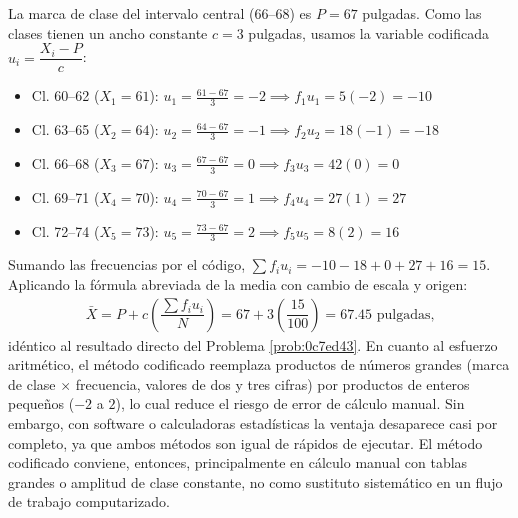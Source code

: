 \begin{solproblema}
	La marca de clase del intervalo central (66--68) es $P = 67$ pulgadas. Como las clases tienen un ancho constante $c = 3$ pulgadas, usamos la variable codificada $u_{i} = \dfrac{X_{i} - P}{c}$:
	\begin{itemize}
		\item Cl. 60--62 ($X_{1}=61$): $u_{1} = \frac{61-67}{3} = -2 \implies f_{1}u_{1} = 5(-2) = -10$
		\item Cl. 63--65 ($X_{2}=64$): $u_{2} = \frac{64-67}{3} = -1 \implies f_{2}u_{2} = 18(-1) = -18$
		\item Cl. 66--68 ($X_{3}=67$): $u_{3} = \frac{67-67}{3} = 0 \implies f_{3}u_{3} = 42(0) = 0$
		\item Cl. 69--71 ($X_{4}=70$): $u_{4} = \frac{70-67}{3} = 1 \implies f_{4}u_{4} = 27(1) = 27$
		\item Cl. 72--74 ($X_{5}=73$): $u_{5} = \frac{73-67}{3} = 2 \implies f_{5}u_{5} = 8(2) = 16$
	\end{itemize}
	Sumando las frecuencias por el código, $\sum f_{i}u_{i} = -10 - 18 + 0 + 27 + 16 = 15$. Aplicando la fórmula abreviada de la media con cambio de escala y origen:
	\begin{align}
		\bar{X} = P + c\left( \dfrac{\sum f_{i}u_{i}}{N} \right) = 67 + 3\left( \dfrac{15}{100} \right) = 67.45 \text{ pulgadas,}
	\end{align}
	idéntico al resultado directo del Problema \ref{prob:0c7ed43}. En cuanto al esfuerzo aritmético, el método codificado reemplaza productos de números grandes (marca de clase $\times$ frecuencia, valores de dos y tres cifras) por productos de enteros pequeños ($-2$ a $2$), lo cual reduce el riesgo de error de cálculo manual. Sin embargo, con software o calculadoras estadísticas la ventaja desaparece casi por completo, ya que ambos métodos son igual de rápidos de ejecutar. El método codificado conviene, entonces, principalmente en cálculo manual con tablas grandes o amplitud de clase constante, no como sustituto sistemático en un flujo de trabajo computarizado.
\end{solproblema}

